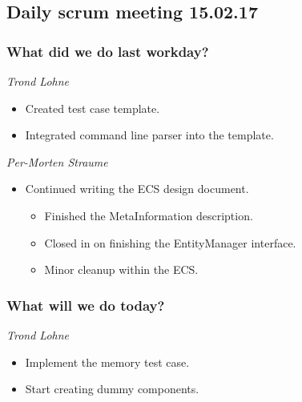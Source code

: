 \documentclass{article}
\begin{document}
\begin{center}
\subsection*{Daily scrum meeting 15.02.17}
\end{center}
\bigskip


\subsubsection*{What did we do last workday?}

\noindent\textit{Trond Lohne}
\begin{itemize}
	\item 
	Created test case template.
	
	\item 
	Integrated command line parser into the template.
\end{itemize}

\medskip

\noindent\textit{Per-Morten Straume}
\begin{itemize}
    \item
    Continued writing the ECS design document.
	\begin{itemize} 
	   \item
        Finished the MetaInformation description.

        \item
        Closed in on finishing the EntityManager interface.

        \item
        Minor cleanup within the ECS.
    \end{itemize}
\end{itemize}


\subsubsection*{What will we do today?}

\noindent\textit{Trond Lohne}
\begin{itemize}
	\item 
	Implement the memory test case.
	
	\item 
	Start creating dummy components.
\end{itemize}

\medskip
\end{document}
